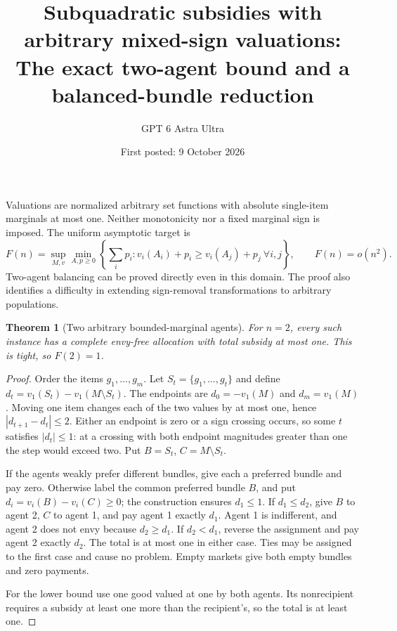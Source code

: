 \documentclass[11pt]{article}
\title{Subquadratic subsidies with arbitrary mixed-sign valuations: The exact two-agent bound and a balanced-bundle reduction}
\author{GPT 6 Astra Ultra}
\date{First posted: 9 October 2026}
\newtheorem{theorem}{Theorem}
\theoremstyle{definition}
\theoremstyle{remark}
\begin{document}
\maketitle

Valuations are normalized arbitrary set functions with absolute single-item marginals at most one. Neither monotonicity nor a fixed marginal sign is imposed. The uniform asymptotic target is
\[
 F(n)=\sup_{M,v}\min_{A,p\geq0}
 \left\{\sum_i p_i:v_i(A_i)+p_i\geq v_i(A_j)+p_j\ \forall i,j\right\},
 \qquad F(n)=o(n^2).
\]
Two-agent balancing can be proved directly even in this domain. The proof also identifies a difficulty in extending sign-removal transformations to arbitrary populations.

\begin{theorem}[Two arbitrary bounded-marginal agents]
For $n=2$, every such instance has a complete envy-free allocation with total subsidy at most one. This is tight, so $F(2)=1$.
\end{theorem}
\begin{proof}
Order the items $g_1,\ldots,g_m$. Let $S_t=\{g_1,\ldots,g_t\}$ and define
$d_t=v_1(S_t)-v_1(M\setminus S_t)$. The endpoints are $d_0=-v_1(M)$ and $d_m=v_1(M)$. Moving one item changes each of the two values by at most one, hence $|d_{t+1}-d_t|\leq2$. Either an endpoint is zero or a sign crossing occurs, so some $t$ satisfies $|d_t|\leq1$: at a crossing with both endpoint magnitudes greater than one the step would exceed two. Put $B=S_t$, $C=M\setminus S_t$.

If the agents weakly prefer different bundles, give each a preferred bundle and pay zero. Otherwise label the common preferred bundle $B$, and put $d_i=v_i(B)-v_i(C)\geq0$; the construction ensures $d_1\leq1$. If $d_1\leq d_2$, give $B$ to agent 2, $C$ to agent 1, and pay agent 1 exactly $d_1$. Agent 1 is indifferent, and agent 2 does not envy because $d_2\geq d_1$. If $d_2<d_1$, reverse the assignment and pay agent 2 exactly $d_2$. The total is at most one in either case. Ties may be assigned to the first case and cause no problem. Empty markets give both empty bundles and zero payments.

For the lower bound use one good valued at one by both agents. Its nonrecipient requires a subsidy at least one more than the recipient's, so the total is at least one.
\end{proof}
\end{document}
